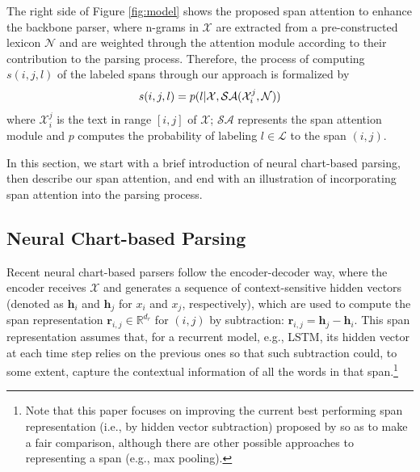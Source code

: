 \documentclass[11pt,a4paper]{article}
\begin{document}
The right side of Figure \ref{fig:model} shows the proposed span attention to enhance the backbone parser,
where n-grams in $\mathcal{X}$ are extracted from a pre-constructed lexicon $\mathcal{N}$ and are weighted through the attention module according to their contribution to the parsing process.
Therefore, the process of computing $s(i, j, l)$ of the labeled spans through our approach is formalized by
\begin{align}
\setlength\abovedisplayskip{5pt}
\setlength\belowdisplayskip{5pt}
    s(i, j, l) = 
p(l|\mathcal{X}, \mathcal{SA}(\mathcal{X}_{i}^{j}, \mathcal{N}))
\end{align}
where $\mathcal{X}_{i}^{j}$ is the text in range $[i,j]$ of $\mathcal{X}$; $\mathcal{SA}$ represents the span attention module and $p$ computes the probability of labeling $l \in \mathcal{L}$ to the span $(i,j)$.

In this section,
we start with a brief introduction of neural chart-based parsing, then describe our span attention, and 
end with an illustration of incorporating span attention into the parsing process.


\subsection{Neural Chart-based Parsing}
\label{sec: neural chart parser}

Recent neural chart-based parsers \cite{stern-etal-2017-minimal,kitaev-klein-2018-constituency,kitaev-etal-2019-multilingual,zhou-zhao-2019-head} follow the encoder-decoder way, where the encoder receives $\mathcal{X}$ and generates a sequence of context-sensitive hidden vectors (denoted as $\mathbf{h}_{i}$ and $\mathbf{h}_{j}$ for $x_{i}$ and $x_{j}$, respectively), which are used to compute the span representation $\mathbf{r}_{i,j} \in \mathbb{R}^{d_{r}}$ for $(i,j)$
by subtraction: $\mathbf{r}_{i,j} = \mathbf{h}_{j} - \mathbf{h}_{i}$.
This span representation assumes that, for a recurrent model, e.g., LSTM, its hidden vector at each time step relies on the previous ones so that such subtraction could, to some extent, capture the contextual information of all the words in that span.\footnote{Note that this paper focuses on improving the current best performing span representation (i.e., by hidden vector subtraction) proposed by \citet{stern-etal-2017-minimal} so as to make a fair comparison, although there are other possible approaches to representing a span (e.g., max pooling).}
\end{document}
